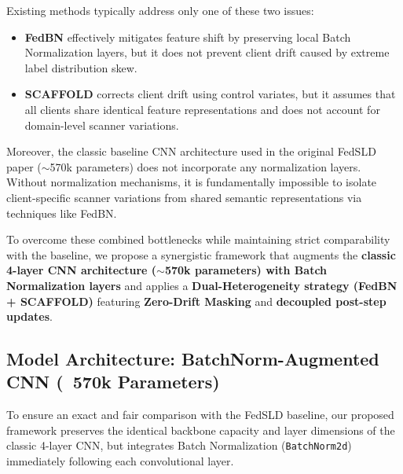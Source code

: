 Existing methods typically address only one of these two issues:
\begin{itemize}
    \item \textbf{FedBN} \cite{li2021fedbn} effectively mitigates feature shift by preserving local Batch Normalization layers, but it does not prevent client drift caused by extreme label distribution skew.
    \item \textbf{SCAFFOLD} \cite{karimireddy2020scaffold} corrects client drift using control variates, but it assumes that all clients share identical feature representations and does not account for domain-level scanner variations.
\end{itemize}

Moreover, the classic baseline CNN architecture used in the original FedSLD paper \cite{luo2022fedsld} ($\sim$570k parameters) does not incorporate any normalization layers. Without normalization mechanisms, it is fundamentally impossible to isolate client-specific scanner variations from shared semantic representations via techniques like FedBN.

To overcome these combined bottlenecks while maintaining strict comparability with the baseline, we propose a synergistic framework that augments the \textbf{classic 4-layer CNN architecture ($\sim$570k parameters) with Batch Normalization layers} and applies a \textbf{Dual-Heterogeneity strategy (FedBN + SCAFFOLD)} featuring \textbf{Zero-Drift Masking} and \textbf{decoupled post-step updates}.

\subsection{Model Architecture: BatchNorm-Augmented CNN (~570k Parameters)}
\label{subsec:lightweight_architecture}

To ensure an exact and fair comparison with the FedSLD baseline, our proposed framework preserves the identical backbone capacity and layer dimensions of the classic 4-layer CNN, but integrates Batch Normalization (\texttt{BatchNorm2d}) immediately following each convolutional layer.

